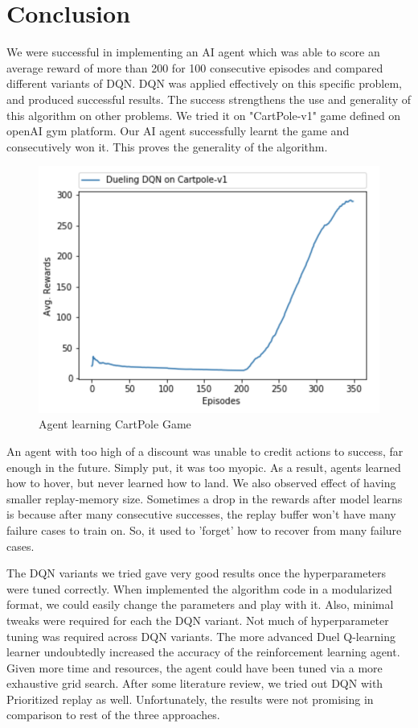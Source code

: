 \section{Conclusion}
\label{sec:conclusion}

We were successful in implementing an AI agent which was able to score an average reward of more than 200 for 100 consecutive episodes and compared different variants of DQN. DQN was applied effectively on this specific problem, and produced successful results. The success strengthens the use and generality of this algorithm on other problems. We tried it on "CartPole-v1" game defined on openAI gym platform. Our AI agent successfully learnt the game and consecutively won it. This proves the generality of the algorithm.

\begin{figure}[!ht]
\centering
\includegraphics[scale=0.75,width=0.75\columnwidth]{figures/Cartpolev1.png}%
\caption{ Agent learning CartPole Game}%
\label{fig:Visualization}%
\end{figure}

An agent with too high of a discount was unable to credit actions to success, far enough in the future. Simply put, it was too myopic. As a result, agents learned how to hover, but never learned how to land. We also observed effect of having smaller replay-memory size. Sometimes a drop in the rewards after model learns is because after many consecutive successes, the replay buffer won't have many failure cases to train on. So, it used to 'forget' how to recover from many failure cases.

The DQN variants we tried gave very good results once the hyperparameters were tuned correctly. When implemented the algorithm code in a modularized format, we could easily change the parameters and play with it. Also, minimal tweaks were required for each the DQN variant. Not much of hyperparameter tuning was required across DQN variants. The more advanced Duel Q-learning learner undoubtedly increased the accuracy of the reinforcement learning agent. Given more time and resources, the agent could have been tuned via a more exhaustive grid search. After some literature review, we tried out DQN with Prioritized replay as well. Unfortunately, the results were not promising in comparison to rest of the three approaches. 